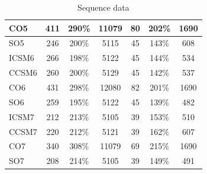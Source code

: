 \begin{table}
\begin{tabular}{| l | c | c | c | c | c | c |}
    CO5 & 411 & 290\% & 11079 & 80 & 202\% & 1690 \\\hline
    SO5 & 246 & 200\% & 5115 & 45 & 143\% & 608 \\\hline
%
    ICSM6 & 266 & 198\% & 5122 & 45 & 144\% & 534 \\\hline
    CCSM6 & 260 & 200\% & 5129 & 45 & 142\% & 537 \\\hline
    CO6 & 431 & 298\% & 12080 & 82 & 201\% & 1690 \\\hline
    SO6 & 259 & 195\% & 5122 & 45 & 139\% & 482 \\\hline
%
    ICSM7 & 212 & 213\% & 5105 & 39 & 153\% & 510 \\\hline
    CCSM7 & 220 & 212\% & 5121 & 39 & 162\% & 607 \\\hline
    CO7 & 340 & 308\% & 11079 & 69 & 215\% & 1690 \\\hline
    SO7 & 208 & 214\% & 5105 & 39 & 149\% & 491 \\\hline
  \end{tabular}
\caption{Sequence data}
\label{tab:algoseq}
\end{table}
%
